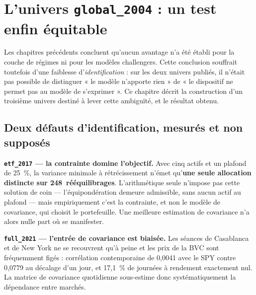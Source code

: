 %

\chapter{L'univers \texttt{global\_2004} : un test enfin équitable}
\label{chap:global2004}

Les chapitres précédents concluent qu'aucun avantage n'a été établi pour la
couche de régimes ni pour les modèles challengers. Cette conclusion souffrait
toutefois d'une faiblesse d'\emph{identification} : sur les deux univers
publiés, il n'était pas possible de distinguer « le modèle n'apporte rien » de
« le dispositif ne permet pas au modèle de s'exprimer ». Ce chapitre décrit la
construction d'un troisième univers destiné à lever cette ambiguïté, et le
résultat obtenu.

\section{Deux défauts d'identification, mesurés et non supposés}

\textbf{\texttt{etf\_2017} — la contrainte domine l'objectif.} Avec cinq actifs
et un plafond de 25~\%, la variance minimale à rétrécissement n'émet
qu'\textbf{une seule allocation distincte sur 248~rééquilibrages}.
L'arithmétique seule n'impose pas cette solution de coin — l'équipondération
demeure admissible, sans aucun actif au plafond — mais empiriquement c'est la
contrainte, et non le modèle de covariance, qui choisit le portefeuille. Une
meilleure estimation de covariance n'a alors nulle part où se manifester.

\textbf{\texttt{full\_2021} — l'entrée de covariance est biaisée.} Les séances
de Casablanca et de New York ne se recouvrent qu'à peine et les prix de la BVC
sont fréquemment figés : corrélation contemporaine de 0,0041 avec le SPY contre
0,0779 au décalage d'un jour, et 17,1~\% de journées à rendement exactement nul.
La matrice de covariance quotidienne sous-estime donc systématiquement la
dépendance entre marchés.

